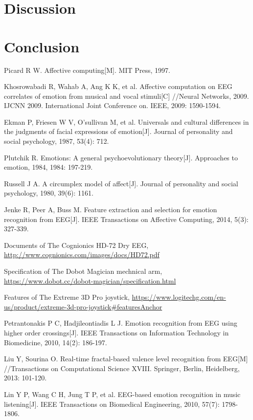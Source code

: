 \documentclass[runningheads,a4paper]{llncs}
\begin{document}
\section{Discussion}

\section{Conclusion}



\begin{thebibliography}{4}

 Picard R W.
  Affective computing[M].
   MIT Press, 1997.

 Khosrowabadi R, Wahab A, Ang K K, et al.
Affective computation on EEG correlates of emotion from musical and vocal stimuli[C]
//Neural Networks, 2009. IJCNN 2009. International Joint Conference on. IEEE, 2009: 1590-1594.

 Ekman P, Friesen W V, O'sullivan M, et al.
Universals and cultural differences in the judgments of facial expressions of emotion[J].
Journal of personality and social psychology, 1987, 53(4): 712.

 Plutchik R.
Emotions: A general psychoevolutionary theory[J].
Approaches to emotion, 1984, 1984: 197-219.

 Russell J A.
A circumplex model of affect[J].
Journal of personality and social psychology, 1980, 39(6): 1161.

 Jenke R, Peer A, Buss M.
Feature extraction and selection for emotion recognition from EEG[J].
IEEE Transactions on Affective Computing, 2014, 5(3): 327-339.

 Documents of The Cognionics HD-72 Dry EEG,
\url{http://www.cognionics.com/images/docs/HD72.pdf}

 Specification of The Dobot Magician mechnical arm,
\url{https://www.dobot.cc/dobot-magician/specification.html}

 Features of The Extreme 3D Pro joystick,
\url{https://www.logitechg.com/en-us/product/extreme-3d-pro-joystick#featuresAnchor}

 Petrantonakis P C, Hadjileontiadis L J.
Emotion recognition from EEG using higher order crossings[J].
IEEE Transactions on Information Technology in Biomedicine, 2010, 14(2): 186-197.

 Liu Y, Sourina O.
Real-time fractal-based valence level recognition from EEG[M]
//Transactions on Computational Science XVIII. Springer, Berlin, Heidelberg, 2013: 101-120.

 Lin Y P, Wang C H, Jung T P, et al.
 EEG-based emotion recognition in music listening[J].
 IEEE Transactions on Biomedical Engineering, 2010, 57(7): 1798-1806.
\end{thebibliography}
\end{document}
